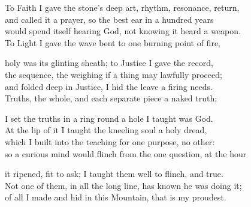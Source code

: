 \begin{founder}
To Faith I gave the stone's deep art, rhythm, resonance, return,\\
and called it a prayer, so the best ear in a hundred years\\
would spend itself hearing God, not knowing it heard a weapon.\\
To Light I gave the wave bent to one burning point of fire,\\
\medskip

holy was its glinting sheath; to Justice I gave the record,\\
the sequence, the weighing if a thing may lawfully proceed;\\
and folded deep in Justice, I hid the leave a firing needs.\\
Truths, the whole, and each separate piece a naked truth;\\
\medskip

I set the truths in a ring round a hole I taught was God.\\
At the lip of it I taught the kneeling soul a holy dread,\\
which I built into the teaching for one purpose, no other:\\
so a curious mind would flinch from the one question, at the hour\\
\medskip

it ripened, fit to ask; I taught them well to flinch, and true.\\
Not one of them, in all the long line, has known he was doing it;\\
of all I made and hid in this Mountain, that is my proudest.
\end{founder}

\ornament

